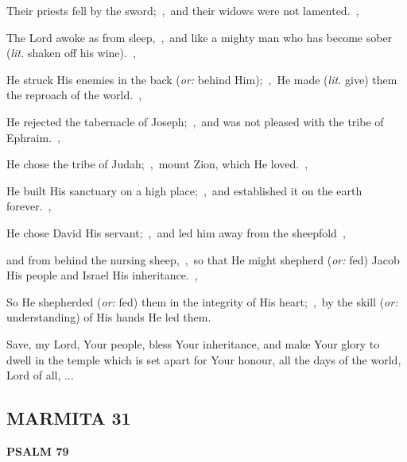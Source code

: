 \documentclass[12pt,twoside,a5paper]{article}
\newcommand{\marmita}[1]{\subsection*{MARMITA {#1}}}
\newcommand{\psalm}[1]{\textbf{PSALM {#1}}\nopagebreak}
\newcommand{\slota}[1]{\liturgicalhint{Slota.} #1}
\newcommand{\translationoption}[1]{\emph{or:} #1}
\newcommand{\translationliteral}[1]{\emph{lit.} #1}
\begin{document}
\begin{normalparskip}
  Their priests fell by the sword;~\sep\ and their widows were not lamented.~\sep

  The Lord awoke as from sleep,~\sep\ and like a mighty man who has become sober (\translationliteral{shaken off his wine}).~\sep

  He struck His enemies in the back (\translationoption{behind Him});~\sep\ He made (\translationliteral{give}) them the reproach of the world.~\sep

  He rejected the tabernacle of Joseph;~\sep\ and was not pleased with the tribe of Ephraim.~\sep

  He chose the tribe of Judah;~\sep\ mount Zion, which He loved.~\sep

  He built His sanctuary on a high place;~\sep\ and established it on the earth forever.~\sep

  He chose David His servant;~\sep\ and led him away from the sheepfold~\sep

  and from behind the nursing sheep,~\sep\ so that He might shepherd (\translationoption{fed}) Jacob His people and Israel His inheritance.~\sep

  So He shepherded (\translationoption{fed}) them in the integrity of His heart;~\sep\ by the skill (\translationoption{understanding}) of His hands He led them.
\end{normalparskip}

\slota{Save, my Lord, Your people, bless Your inheritance, and make Your glory to dwell in the temple which is set apart for Your honour, all the days of the world, Lord of all, ...}

\marmita{31}

\psalm{79}
\end{document}
